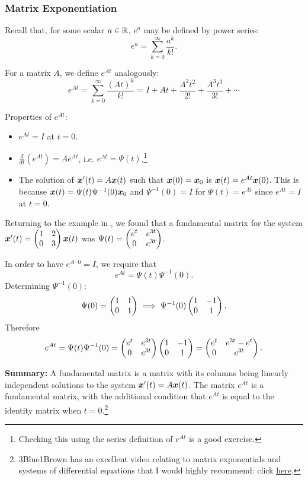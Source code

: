 \subsubsection{Matrix Exponentiation}

Recall that, for some scalar $a \in \mathbb{R}$, $e^a$ may be defined by power series:
\[
e^a = \sum_{k=0}^{\infty} \frac{a^k}{k!}.
\]

For a matrix $A$, we define $e^{At}$ analogously:
\[
e^{At} = \sum_{k=0}^{\infty} \frac{(At)^k}{k!} = I + At + \frac{A^2t^2}{2!} + \frac{A^3t^3}{3!} + \cdots
\]

Properties of $e^{At}$:
\begin{itemize}
	\item $e^{At} = I$ at $t=0$.
	\item $\frac{d}{dt}(e^{At}) = A e^{At}$, i.e. $e^{At} = \Psi(t)$.\footnote{Checking this using the series definition of $e^{At}$ is a good exercise.}
	\item The solution of $\bm{x}'(t) = A\bm{x}(t)$ such that $\bm{x}(0) = \bm{x}_0$ is $\bm{x}(t) = e^{At} \bm{x}(0)$. This is because $\bm{x}(t) = \Psi(t) \Psi^{-1}(0) \bm{x}_0$ and $\Psi^{-1}(0) = I$ for $\Psi(t) = e^{At}$ since $e^{At} = I$ at $t=0$.
\end{itemize}

\begin{eg}
	Returning to the example in , we found that a fundamental matrix for the system $\bm{x}'(t) = \begin{pmatrix}1 & 2 \\ 0 & 3\end{pmatrix} \bm{x}(t)$ was $\Psi(t) = \begin{pmatrix}e^t & e^{3t} \\ 0 & e^{3t}\end{pmatrix}$.
	
	In order to have $e^{A\cdot 0} = I$, we require that
	\[
	e^{At} = \Psi(t) \Psi^{-1}(0).
	\]
	Determining $\Psi^{-1}(0)$:
	\[
	\Psi(0) = \begin{pmatrix}1 & 1 \\ 0 & 1\end{pmatrix} \implies \Psi^{-1}(0) \begin{pmatrix}1 & -1 \\ 0 & 1\end{pmatrix}.
	\]
	Therefore
	\[
	e^{At} = \Psi(t) \Psi^{-1}(0) = \begin{pmatrix}e^t & e^{3t} \\ 0 & e^{3t}\end{pmatrix} \begin{pmatrix}1 & -1 \\ 0 & 1\end{pmatrix} = \begin{pmatrix}e^t & e^{3t}-e^t \\ 0 & e^{3t}\end{pmatrix}.
	\]
\end{eg}

\textbf{Summary:} A fundamental matrix is a matrix with its columns being linearly independent solutions to the system $\bm{x}'(t) = A\bm{x}(t)$. The matrix $e^{At}$ is a fundamental matrix, with the additional condition that $e^{At}$ is equal to the identity matrix when $t=0$.\footnote{3Blue1Brown has an excellent video relating to matrix exponentials and systems of differential equations that I would highly recommend: click \href{https://www.youtube.com/watch?v=O85OWBJ2ayo}{here}.}

